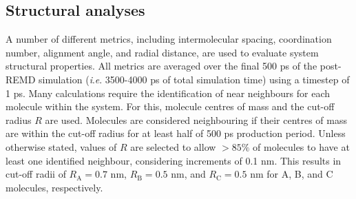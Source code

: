 \subsection{Structural analyses}
A number of different metrics, including intermolecular spacing, coordination number, alignment angle, and radial distance, are used to evaluate system structural properties. All metrics are averaged over the  final 500 ps of the post-REMD simulation (\textit{i}.\textit{e}. 3500-4000 ps of total simulation time) using a timestep of 1 ps. 
Many calculations require the identification of near neighbours for each molecule within the system. For this, molecule centres of mass and the cut-off radius $R$ are used. Molecules are considered neighbouring if their centres of mass are within the cut-off radius for at least half of 500 ps production period. Unless otherwise stated, values of $R$ are selected to allow $>85\%$ of molecules to have at least one identified neighbour, considering increments of 0.1 nm. This results in cut-off radii of $R_{\text{A}} = 0.7$ nm, $R_{\text{B}} = 0.5$ nm, and $R_{\text{C}} = 0.5$ nm for A, B, and C molecules, respectively. 


